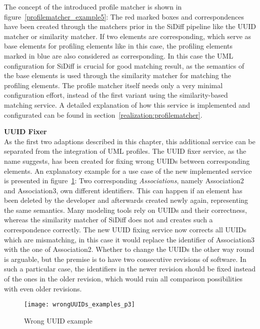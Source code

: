 \begin{enumerate}
		The concept of the introduced profile matcher is shown in
		figure~\ref{profilematcher_example5}: The red marked boxes and correspondences
		have been created through the matchers prior in the SiDiff pipeline like the
		\ac{UUID} matcher or similarity matcher. If two elements are corresponding, which serve as base
		elements for profiling elements like in this case, the profiling elements
		marked in blue are also considered as corresponding. In this case the
		\ac{UML} configuration for SiDiff is crucial for good matching result, as
		the semantics of the base elements is used through the similarity matcher for
		matching the profiling elements. The profile matcher itself needs only a very minimal configuration
		effort, instead of the first variant using the similarity-based matching
		service. A detailed explanation of how this service is implemented and
		configurated can be found in section~\ref{realization:profilematcher}.
\end{enumerate}
\textbf{\ac{UUID} Fixer}\\
As the first two adaptions described in this chapter, this additional service
can be separated from the integration of \ac{UML} profiles. The \ac{UUID} fixer
service, as the name suggests, has been created for fixing wrong \ac{UUID}s
between corresponding elements. An explanatory example for a use case of the new
implemented service is presented in figure~\ref{wrongUUIDs_examples_p3}: Two
corresponding \textit{Associations}, namely Association2 and Association3, own
different identifiers. This can happen if an element has been deleted by the
developer and afterwards created newly again, representing the same semantics.
Many modeling tools rely on \ac{UUID}s and their correctness, whereas the
similarity matcher of SiDiff does not and creates such a correspondence
correctly. The new \ac{UUID} fixing service now corrects all \ac{UUID}s which
are mismatching, in this case it would replace the identifier of
Association3 with the one of Association2. Whether to change the \ac{UUID}s the
other way round is arguable, but the premise is to have two
consecutive revisions of software. In such a particular case, the identifiers in
the newer revision should be fixed instead of the ones in the older revision,
which would ruin all comparison possibilities with even older revisions.

\begin{figure}[h!]
\begin{center}
\texttt{[image: wrongUUIDs\_examples\_p3]}\\
\end{center}
\caption{Wrong \ac{UUID} example}
\label{wrongUUIDs_examples_p3}
\end{figure}

